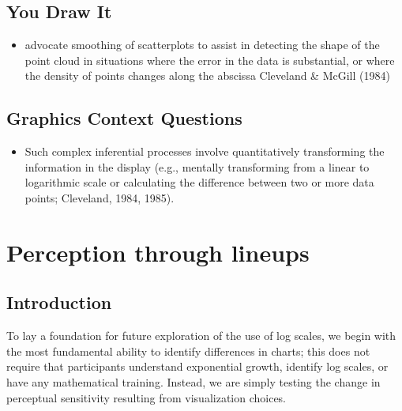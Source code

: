 \documentclass[print]{nuthesis}
\providecommand{\tightlist}{%
  \setlength{\itemsep}{0pt}\setlength{\parskip}{0pt}}
\begin{document}
\hypertarget{you-draw-it}{%
\section{You Draw It}\label{you-draw-it}}

\begin{itemize}
\tightlist
\item
  advocate smoothing of scatterplots to assist in detecting the shape of the point cloud in situations where the error in the data is substantial, or where the density of points changes along the abscissa Cleveland \& McGill (1984)
\end{itemize}

\hypertarget{graphics-context-questions}{%
\section{Graphics Context Questions}\label{graphics-context-questions}}

\begin{itemize}
\tightlist
\item
  Such complex inferential processes involve quantitatively transforming the information in the display (e.g., mentally transforming from a linear to logarithmic scale or calculating the difference between two or more data points; Cleveland, 1984, 1985).
\end{itemize}

\hypertarget{lineups}{%
\chapter{Perception through lineups}\label{lineups}}

\hypertarget{introduction}{%
\section{Introduction}\label{introduction}}

To lay a foundation for future exploration of the use of log scales, we begin with the most fundamental ability to identify differences in charts; this does not require that participants understand exponential growth, identify log scales, or have any mathematical training.
Instead, we are simply testing the change in perceptual sensitivity resulting from visualization choices.
\end{document}
